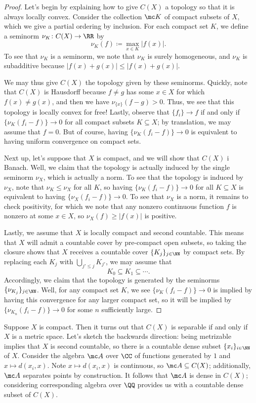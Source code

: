 \documentclass[notes.tex]{subfiles}
\begin{document}
\begin{proof}
	Let's begin by explaining how to give $C(X)$ a topology so that it is always locally convex. Consider the collection $\mc K$ of compact subsets of $X$, which we give a partial ordering by inclusion. For each compact set $K$, we define a seminorm $\nu_K\colon C(X)\to\RR$ by
	\[\nu_K(f)\coloneqq\max_{x\in K}\left|f(x)\right|.\]
	To see that $\nu_K$ is a seminorm, we note that $\nu_K$ is surely homogeneous, and $\nu_K$ is subadditive because $\left|f(x)+g(x)\right|\le\left|f(x)+g(x)\right|$.
	
	We may thus give $C(X)$ the topology given by these seminorms. Quickly, note that $C(X)$ is Hausdorff because $f\ne g$ has some $x\in X$ for which $f(x)\ne g(x)$, and then we have $\nu_{\{x\}}(f-g)>0$. Thus, we see that this topology is locally convex for free! Lastly, observe that $\{f_i\}\to f$ if and only if $\{\nu_K(f_i-f)\}\to0$ for all compact subsets $K\subseteq X$; by translation, we may assume that $f=0$. But of course, having $\{\nu_K(f_i-f)\}\to0$ is equivalent to having uniform convergence on compact sets.

	Next up, let's suppose that $X$ is compact, and we will show that $C(X)$ i Banach. Well, we claim that the topology is actually induced by the single seminorm $\nu_X$, which is actually a norm. To see that the topology is induced by $\nu_X$, note that $\nu_K\le\nu_X$ for all $K$, so having $\{\nu_K(f_i-f)\}\to0$ for all $K\subseteq X$ is equivalent to having $\{\nu_X(f_i-f)\}\to0$. To see that $\nu_X$ is a norm, it remains to check positivity, for which we note that any nonzero continuous function $f$ is nonzero at some $x\in X$, so $\nu_X(f)\ge\left|f(x)\right|$ is positive.

	Lastly, we assume that $X$ is locally compact and second countable. This means that $X$ will admit a countable cover by pre-compact open subsets, so taking the closure shows that $X$ receives a countable cover $\{K_j\}_{j\in\NN}$ by compact sets. By replacing each $K_j$ with $\bigcup_{j'\le j}K_{j'}$, we may assume that
	\[K_0\subseteq K_1\subseteq\cdots.\]
	Accordingly, we claim that the topology is generated by the seminorms $\{\nu_{K_j}\}_{j\in\NN}$. Well, for any compact set $K$, we see $\{\nu_K(f_i-f)\}\to0$ is implied by having this convergence for any larger compact set, so it will be implied by $\{\nu_{K_n}(f_i-f)\}\to0$ for some $n$ sufficiently large.
\end{proof}
\begin{remark}
	Suppose $X$ is compact. Then it turns out that $C(X)$ is separable if and only if $X$ is a metric space. Let's sketch the backwards direction: being metrizable implies that $X$ is second countable, so there is a countable dense subset $\{x_i\}_{i\in\NN}$ of $X$. Consider the algebra $\mc A$ over $\CC$ of functions generated by $1$ and $x\mapsto d(x_i,x)$. Note $x\mapsto d(x_i,x)$ is continuous, so $\mc A\subseteq C(X)$; additionally, $\mc A$ separates points by construction. It follows that $\mc A$ is dense in $C(X)$; considering corresponding algebra over $\QQ$ provides us with a countable dense subset of $C(X)$.
\end{remark}
\end{document}
